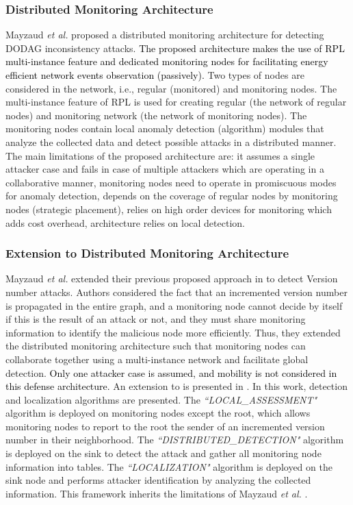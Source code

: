\documentclass[10pt,journal,sort & compress]{IEEEtran}
\begin{document}
\subsubsection*{Distributed Monitoring Architecture}
Mayzaud \textit{et al.} \cite{Mayzaud2016} proposed a distributed monitoring architecture for detecting DODAG inconsistency attacks. \textcolor{black}{The proposed architecture makes the use of RPL multi-instance feature and dedicated monitoring nodes for facilitating energy efficient network events observation (passively).} Two types of nodes are considered in the network, i.e., regular (monitored) and monitoring nodes. The multi-instance feature of RPL is used for creating regular (the network of regular nodes) and monitoring network (the network of monitoring nodes). The monitoring nodes contain local anomaly detection (algorithm) modules that analyze the collected data and detect possible attacks in a distributed manner. The main limitations of the proposed architecture are: it assumes a single attacker case and fails in case of multiple attackers which are operating in a collaborative manner, monitoring nodes need to operate in promiscuous modes for anomaly detection, depends on the coverage of regular nodes by monitoring nodes (strategic placement), relies on high order devices for monitoring which adds cost overhead, architecture relies on local detection. 

\subsubsection*{Extension to Distributed Monitoring Architecture}

Mayzaud \textit{et al.} extended their previous proposed approach \cite{Mayzaud2016} in \cite{Mayzaud2016Version} to detect Version number attacks. Authors considered the fact that an incremented version number is propagated in the entire graph, and a monitoring node cannot decide by itself if this is the result of an attack or not, and they must share monitoring information to identify the malicious node more efficiently. Thus, they extended the distributed monitoring architecture such that monitoring nodes can collaborate together using a multi-instance network and facilitate global detection. \textcolor{black}{Only one attacker case is assumed, and mobility is not considered in this defense architecture.} An extension to \cite{Mayzaud2016Version} is presented in \cite{Mayzaud2017}. In this work, detection and localization algorithms are presented. The \textit{``LOCAL\_ASSESSMENT"} algorithm is deployed on monitoring nodes except the root, which allows monitoring nodes to report to the root the sender of an incremented version number in their neighborhood. The \textit{``DISTRIBUTED\_DETECTION"} algorithm is deployed on the sink to detect the attack and gather all monitoring node information into tables. The \textit{``LOCALIZATION"} algorithm is deployed on the sink node and performs attacker identification by analyzing the collected information. This framework inherits the limitations of Mayzaud \textit{et al.} \cite{Mayzaud2016}.         
\end{document}
